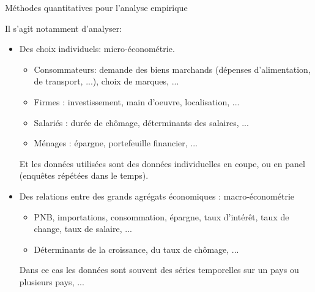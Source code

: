 \begin{frame}[allowframebreaks]{Méthodes quantitatives pour l'analyse empirique}

Il s'agit notamment d'analyser:

\begin{itemize}
\item Des choix individuels: micro-économétrie.
\begin{itemize}
  \item Consommateurs: demande des biens marchands (dépenses
d'alimentation, de transport, ...), choix de marques, ...
  \item Firmes : investissement, main d'oeuvre, localisation, ...
  \item Salariés : durée de chômage, déterminants des salaires, ...
 \item  Ménages : épargne, portefeuille financier, ...
\end{itemize}
Et les données utilisées sont des données individuelles en coupe, ou en
panel (enquêtes répétées dans le temps).

\framebreak

\item Des relations entre des grands agrégats économiques :
  macro-économétrie
\begin{itemize}
  \item PNB, importations, consommation, épargne, taux d'intérêt, taux de
change, taux de salaire, ...
\item Déterminants de la croissance, du taux de chômage, ...
\end{itemize}
Dans ce cas les données sont souvent des séries temporelles sur un pays ou plusieurs pays, ...
\end{itemize}
\end{frame}

